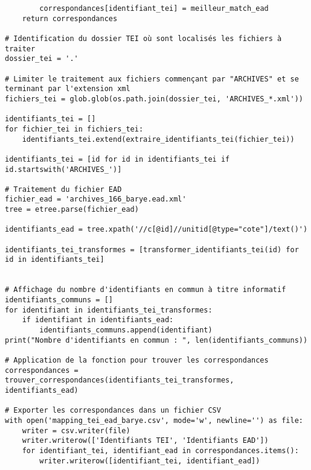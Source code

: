 \begin{verbatim}
        correspondances[identifiant_tei] = meilleur_match_ead
    return correspondances

# Identification du dossier TEI où sont localisés les fichiers à traiter
dossier_tei = '.'

# Limiter le traitement aux fichiers commençant par "ARCHIVES" et se terminant par l'extension xml
fichiers_tei = glob.glob(os.path.join(dossier_tei, 'ARCHIVES_*.xml'))

identifiants_tei = []
for fichier_tei in fichiers_tei:
    identifiants_tei.extend(extraire_identifiants_tei(fichier_tei))

identifiants_tei = [id for id in identifiants_tei if id.startswith('ARCHIVES_')]

# Traitement du fichier EAD
fichier_ead = 'archives_166_barye.ead.xml'
tree = etree.parse(fichier_ead)

identifiants_ead = tree.xpath('//c[@id]//unitid[@type="cote"]/text()')

identifiants_tei_transformes = [transformer_identifiants_tei(id) for id in identifiants_tei]


# Affichage du nombre d'identifiants en commun à titre informatif
identifiants_communs = []
for identifiant in identifiants_tei_transformes:
    if identifiant in identifiants_ead:
        identifiants_communs.append(identifiant)
print("Nombre d'identifiants en commun : ", len(identifiants_communs))

# Application de la fonction pour trouver les correspondances
correspondances = trouver_correspondances(identifiants_tei_transformes, identifiants_ead)

# Exporter les correspondances dans un fichier CSV
with open('mapping_tei_ead_barye.csv', mode='w', newline='') as file:
    writer = csv.writer(file)
    writer.writerow(['Identifiants TEI', 'Identifiants EAD'])
    for identifiant_tei, identifiant_ead in correspondances.items():
        writer.writerow([identifiant_tei, identifiant_ead])
\end{verbatim}